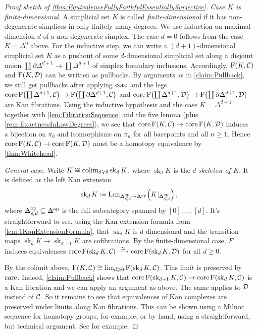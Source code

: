 \begin{proof}[Proof sketch of \cref{thm:EquivalenceFullyFaithfulEssentiallySurjective}]
	\emph{Case $K$ is finite-dimensional.} A simplicial set $K$ is called \emph{finite-dimensional} if it has non-degenerate simplices in only finitely many degrees. We use induction on maximal dimension $d$ of a non-degenerate simplex.  The case $d=0$ follows from the case $K=\Delta^0$ above. For the inductive step, we can write a $(d+1)$-dimensional simplicial set $K$ as a pushout of some $d$-dimensional simplicial set along a disjoint union $\coprod\partial\Delta^{d+1}\rightarrow\coprod\Delta^{d+1}$ of simplex boundary inclusions. Accordingly, $\operatorname{F}(K,\mathcal{C})$ and $\operatorname{F}(K,\mathcal{D})$ can be written as pullbacks. By arguments as in \cref{claim:Pullback}, we still get pullbacks after applying $\operatorname{core}$ and the legs $\core \F\left(\coprod\Delta^{d+1},\Cc\right)\rightarrow\F\left(\coprod\partial\Delta^{d+1},\Cc\right)$ and $\core \F\left(\coprod\Delta^{d+1},\Dd\right)\rightarrow\F\left(\coprod\partial\Delta^{d+1},\Dd\right)$ are Kan fibrations. Using the inductive hypothesis and the case $K=\Delta^{d+1}$ together with \cref{lem:FibrationSequence} and the five lemma (plus \cref{rem:ExactnessInLowDegrees}), we see that $\operatorname{core}\operatorname{F}(K,\mathcal{C})\rightarrow\operatorname{core}\operatorname{F}(K,\mathcal{D})$ induces a bijection on $\pi_0$ and isomorphisms on $\pi_n$ for all basepoints and all $n\geqslant 1$. Hence $\operatorname{core}\operatorname{F}(K,\mathcal{C})\rightarrow\operatorname{core}\operatorname{F}(K,\mathcal{D})$ must be a homotopy equivalence by \cref{thm:Whitehead}.
	
	\emph{General case.} Write $K\cong \operatorname*{colim}_{d\geqslant 0}\operatorname{sk}_dK$, where $\operatorname{sk}_dK$ is the \emph{$d$-skeleton of $K$}. It is defined as the left Kan extension 
	\begin{equation*}
		\operatorname{sk}_dK\coloneqq \Lan_{\IDelta_{\leqslant d}^\op\rightarrow\IDelta^\op}\left(K|_{\IDelta_{\leqslant d}^\op}\right)\,,
	\end{equation*}
	where $\IDelta_{\leqslant d}^\op\subseteq\IDelta^\op$ is the full subcategory spanned by $[0],\dotsc,[d]$. It's straightforward to see, using the Kan extension formula from \cref{lem:1KanExtensionFormula}, that $\operatorname{sk}_dK$ is $d$-dimensional and the transition maps $\operatorname{sk}_dK\rightarrow\operatorname{sk}_{d+1}K$ are cofibrations. By the finite-dimensional case, $F$ induces equivalences $\operatorname{core} \operatorname{F}(\operatorname{sk}_dK,\mathcal{C})\overset{\simeq}{\longrightarrow}\operatorname{core}\operatorname{F}(\operatorname{sk}_dK,\mathcal{D})$ for all $d\geqslant 0$.
	
	By the colimit above, $\operatorname{F}(K,\mathcal{C})\cong\operatorname*{lim}_{d\geqslant 0}\operatorname{F}(\operatorname{sk}_dK,\mathcal{C})$. This limit is preserved by $\operatorname{core}$. Indeed, \cref{claim:Pullback} shows that $\operatorname{core} \operatorname{F}(\operatorname{sk}_{d+1}K,\mathcal{C})\rightarrow \operatorname{core} \operatorname{F}(\operatorname{sk}_dK,\mathcal{C})$ is a Kan fibration and we can apply an argument as above. The same applies to $\mathcal{D}$ instead of $\mathcal{C}$. So it remains to see that equivalences of Kan complexes are preserved under limits along Kan fibrations. This can be shown using a Milnor sequence for homotopy groups, for example, or by hand, using a straightforward, but technical argument. See \cite[Lemma~VII.12]{HigherCatsI} for example.
\end{proof}

